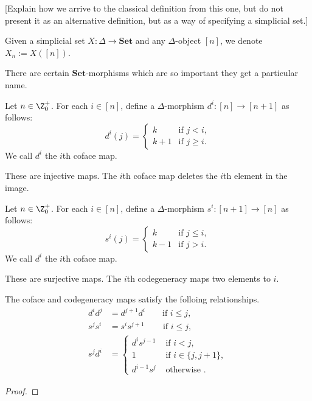 [Explain how we arrive to the classical definition from this one, but do not present it as an alternative definition, but as a way of specifying a simplicial set.]



\begin{remark}
    Given a simplicial set \(X\colon \Delta\to \mathbf{Set}\) and any \(\Delta\)-object \([n]\), 
    we denote \(X_n := X([n])\).
\end{remark}

There are certain \(\mathbf{Set}\)-morphisms which are so important they get a particular name.

\begin{definition}
    Let \(n\in \Z^+_0\). 
    For each \(i\in [n]\), 
    define a \(\Delta\)-morphism \(d^i\colon [n] \to [n+1]\) as follows:
    \[d^i(j) = \begin{cases}
        k& \text{if } j < i,\\
        k+1 & \text{if } j\geq  i.
    \end{cases}\]
    We call \(d^i\) the \(i\)th coface map.
\end{definition}

These are injective maps.
The \(i\)th coface map deletes the \(i\)th element in the image.

\begin{definition}
    Let \(n\in \Z^+_0\). 
    For each \(i\in [n]\), 
    define a \(\Delta\)-morphism \(s^i\colon [n+1] \to [n]\) as follows:
    \[s^i(j) = \begin{cases}
        k& \text{if } j \leq i,\\
        k-1 & \text{if } j >  i.
    \end{cases}\]
    We call \(d^i\) the \(i\)th coface map.
\end{definition}

These are surjective maps.
The \(i\)th codegeneracy maps two elements to \(i\).

\begin{theorem}
    The coface and codegeneracy maps satisfy the folloing relationships.
    \begin{align*}
        d^id^j &= d^{j+1} d^i       \qquad\text{if } i\leq j,\\
        s^{j}s^i &= s^i s^{j+1}     \qquad\,\text{if } i\leq j,\\
        s^jd^i &= \begin{cases}
            d^i s^{j-1} &\text{ if } i <j, \\
            1 & \text{ if } i\in \{j,j+1\}, \\
            d^{i-1} s^j & \text{ otherwise }.
        \end{cases}
    \end{align*}
\end{theorem}
\begin{proof}
    
\end{proof}

